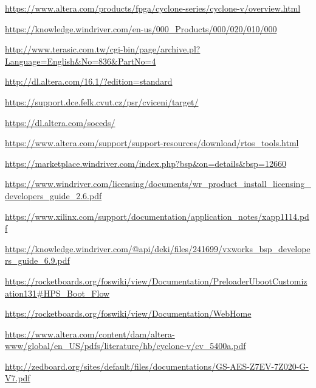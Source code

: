 \label{app:bibliography}

\manualmark
\markboth{\spacedlowsmallcaps{\bibname}}{\spacedlowsmallcaps{\bibname}} %
{}


\printbibliography

\begin{itemize}
\begin{sloppypar}
\item \url{https://www.altera.com/products/fpga/cyclone-series/cyclone-v/overview.html}
\item \url{https://knowledge.windriver.com/en-us/000_Products/000/020/010/000}
\item \url{http://www.terasic.com.tw/cgi-bin/page/archive.pl?Language=English&No=836&PartNo=4}
\item \url{http://dl.altera.com/16.1/?edition=standard}
\item \url{https://support.dce.felk.cvut.cz/psr/cviceni/target/}
\item \url{https://dl.altera.com/soceds/}
\item \url{https://www.altera.com/support/support-resources/download/rtos_tools.html}
\item \url{https://marketplace.windriver.com/index.php?bsp&on=details&bsp=12660}
\item \url{https://www.windriver.com/licensing/documents/wr_product_install_licensing_developers_guide_2.6.pdf}
\item \url{https://www.xilinx.com/support/documentation/application_notes/xapp1114.pdf}
\item \url{https://knowledge.windriver.com/@api/deki/files/241699/vxworks_bsp_developers_guide_6.9.pdf}
\item \url{https://rocketboards.org/foswiki/view/Documentation/PreloaderUbootCustomization131#HPS_Boot_Flow}
\item \url{https://rocketboards.org/foswiki/view/Documentation/WebHome}
\item \url{https://www.altera.com/content/dam/altera-www/global/en_US/pdfs/literature/hb/cyclone-v/cv_5400a.pdf}
\item \url{http://zedboard.org/sites/default/files/documentations/GS-AES-Z7EV-7Z020-G-V7.pdf}

\end{sloppypar}
\end{itemize}
